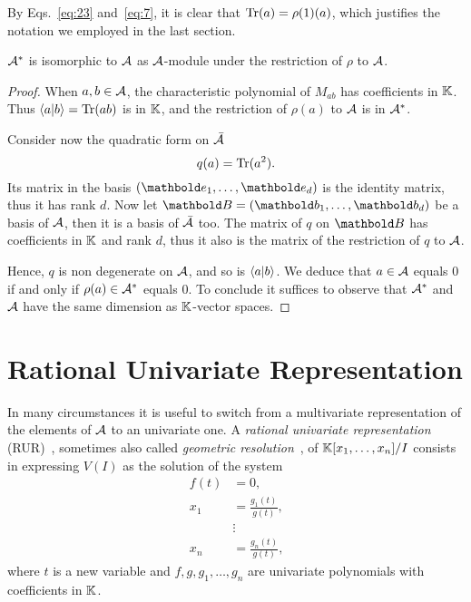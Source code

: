 By Eqs.~\eqref{eq:23} and~\eqref{eq:7}, it is clear that
$\operatorname{Tr}(a)=\rho(1)(a)$, which justifies the notation we employed in the
last section. 

\begin{theorem}
  $\mathcal{A}^\ast$ is isomorphic to $\mathcal{A}$ as
  $\mathcal{A}$-module under the restriction of $\rho$ to $\mathcal{A}$.
\end{theorem}
\begin{proof}
  When $a,b\in\mathcal{A}$, the characteristic polynomial of $M_{ab}$
  has coefficients in $\mathbb{K}$. Thus $\left\langle a \middle| b \right\rangle=\operatorname{Tr}(ab)$ is in $\mathbb{K}$,
  and the restriction of $\rho(a)$ to $\mathcal{A}$ is in
  $\mathcal{A}^\ast$.

  Consider now the quadratic form on $\bar{\mathcal{A}}$
  \begin{equation}
    \label{eq:113}
    q(a) = \operatorname{Tr}(a^2)
    \text{.}
  \end{equation}
  Its matrix in the basis $(\basis{e}_1,\ldots,\basis{e}_d)$ is the
  identity matrix, thus it has rank $d$. Now let
  $\basis{B}=(\basis{b}_1,\ldots,\basis{b}_d)$ be a basis of
  $\mathcal{A}$, then it is a basis of $\bar{\mathcal{A}}$ too. The
  matrix of $q$ on $\basis{B}$ has coefficients in $\mathbb{K}$ and rank $d$,
  thus it also is the matrix of the restriction of $q$ to $\mathcal{A}$.

  Hence, $q$ is non degenerate on $\mathcal{A}$, and so is
  $\left\langle a \middle| b \right\rangle$. We deduce that $a\in\mathcal{A}$ equals $0$ if and
  only if $\rho(a)\in\mathcal{A}^\ast$ equals $0$. To conclude it
  suffices to observe that $\mathcal{A}^\ast$ and $\mathcal{A}$ have the
  same dimension as $\mathbb{K}$-vector spaces.
\end{proof}


\section{Rational Univariate Representation}
\label{sec:rati-univ-repr}
  In many circumstances it
is useful to switch from a multivariate representation of the elements
of $\mathcal{A}$ to an univariate one. A \emph{rational univariate
  representation} (RUR)~\cite{rouiller99}, sometimes also called
\emph{geometric resolution}~\cite{giusti+lecerf+salvy01}, of
$\mathbb{K}[x_1,\ldots,x_n]/I$ consists in expressing $V(I)$ as the solution
of the system
\begin{equation}
  \label{eq:22}
  \begin{aligned}
    f(t) &= 0\text{,}\\
    x_1 &= \frac{g_1(t)}{g(t)}\text{,}\\
    &\vdots\\
    x_n &= \frac{g_n(t)}{g(t)}\text{,}    
  \end{aligned}
\end{equation}
where $t$ is a new variable and $f,g,g_1,\ldots,g_n$ are univariate
polynomials with coefficients in $\mathbb{K}$.


